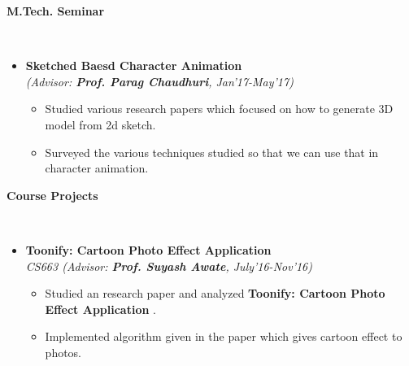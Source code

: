 \documentclass[a4paper,10pt]{article}
\newcommand{\isep}{-2 pt}
\newcommand{\lsep}{-0.5cm}
\newcommand{\resheading}[1]{{\small \colorbox{mygrey}{\begin{minipage}{0.975\textwidth}{\textbf{#1 \vphantom{p\^{E}}}}\end{minipage}}}}
\begin{document}
\resheading{\textbf{\large M.Tech. Seminar} }\\[\lsep]
\begin{itemize}
\item \textbf{ Sketched Baesd Character Animation
} \\
 \emph{(Advisor: \textbf{Prof. Parag Chaudhuri}, Jan’17-May’17)} \\[-0.6cm]
	\begin{itemize}\itemsep \isep
	\item Studied various research papers which focused on how to generate 3D model from 2d sketch.
 	\item Surveyed  the various  techniques studied  so that we can use that in character animation.

	\end{itemize}
\end{itemize}




\resheading{\textbf{\large Course Projects}}\\[\lsep]

\begin{itemize}
\item \textbf{Toonify: Cartoon Photo Effect Application} \\
\emph{	CS663 (Advisor: \textbf{Prof. Suyash Awate}, July'16-Nov'16)}\\[-0.6cm]
      \begin{itemize}\itemsep \isep
	    \item Studied an research paper and analyzed  {\bf Toonify: Cartoon Photo Effect Application} .
		\item Implemented algorithm given in the paper which gives cartoon effect to photos.
      \end{itemize}
\end{itemize}
\end{document}
